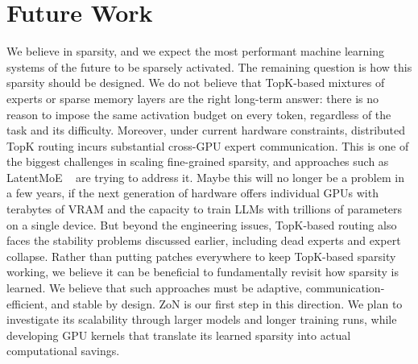 \section{Future Work}
We believe in sparsity, and we expect the most performant machine learning systems
of the future to be sparsely activated. The remaining question is how
this sparsity should be designed. We do not believe that TopK-based
mixtures of experts or sparse memory layers are the right long-term
answer: there is no reason to impose the same activation budget on
every token, regardless of the task and its difficulty. Moreover, under
current hardware constraints, distributed TopK routing incurs substantial
cross-GPU expert communication. This is one of the biggest challenges in
scaling fine-grained sparsity, and approaches such as LatentMoE
~\citep{elango2026latentmoeoptimalaccuracyflop} are trying to address
it. Maybe this will no longer be a problem in a few years, if the next generation
of hardware offers individual GPUs with terabytes of VRAM and the capacity to train
LLMs with trillions of parameters on a single device.
But beyond the engineering issues, TopK-based routing also faces 
the stability problems discussed earlier, including
dead experts and expert collapse. Rather than putting patches everywhere
to keep TopK-based sparsity working, we believe it can be beneficial to fundamentally
revisit how sparsity is learned. We believe that such approaches must be adaptive, communication-efficient,
and stable by design. ZoN is our first step in this direction. We plan
to investigate its scalability through larger models and longer training
runs, while developing GPU kernels that translate its learned sparsity
into actual computational savings.